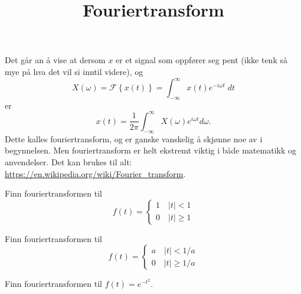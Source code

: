 \documentclass[a4paper,norsk,11pt]{interaktiv}
\title{Fouriertransform}
\begin{document}

\maketitle

Det går an å vise at dersom $x$ er et signal som oppfører seg pent (ikke tenk så mye på hva det vil si inntil videre), 
og
\[
X(\omega) = \mathcal{F}\left\{ x(t) \right\}=\int_{-\infty}^{\infty} x(t)e^{-i\omega t}\;dt
\]
er
\[
x(t) = \frac{1}{2\pi}\int_{-\infty}^{\infty}X(\omega)e^{i\omega t}d\omega.
\]
Dette kalles fouriertransform, 
og er ganske vanskelig å skjønne noe av i begynnelsen. 
Men fouriertransform er helt ekstremt viktig i både matematikk og anvendelser. 
Det kan brukes til alt: \url{https://en.wikipedia.org/wiki/Fourier_transform}.

\begin{oppgave}{1}
Finn fouriertransformen til 
\[
f(t)=
\begin{cases} 
1 \quad |t|<1 \\
0 \quad |t|\geq 1
\end{cases}
\]
\end{oppgave}

\begin{oppgave}{2}
Finn fouriertransformen til 
\[
f(t)=
\begin{cases} 
a \quad |t|<1/a \\
0 \quad |t|\geq 1/a
\end{cases}
\]
\end{oppgave}


\begin{oppgave}{3}
Finn fouriertransformen til $f(t)=e^{-t^2}$.
\end{oppgave}
\end{document}
